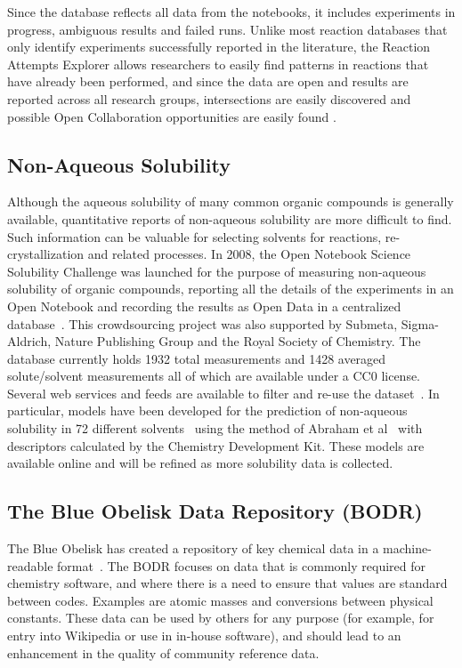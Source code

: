 \documentclass[10pt]{bmc_article}
\newenvironment{bmcformat}{\fussy\setboolean{publ}{true}}{\fussy}
\begin{document}
\begin{bmcformat}
Since the database reflects all data
from the notebooks, it includes experiments in progress, ambiguous results and
failed runs. Unlike most reaction databases that only identify
experiments successfully reported in the literature, 
the Reaction
Attempts Explorer allows researchers to easily find patterns in
reactions that have already been performed, 
and since the data are open
and results are reported across all research groups, intersections are
easily discovered and possible Open Collaboration opportunities are
easily found \cite{UsefulChemSocialNetworks, ekins_collaboration_2011}.

\subsection*{Non-Aqueous Solubility}

Although the aqueous solubility of many common organic compounds is
generally available, quantitative reports of non-aqueous solubility
are more difficult to find.
Such information can be valuable for selecting solvents for
reactions, re-crystallization and related processes. In 2008, the Open
Notebook Science Solubility Challenge was launched for the purpose of
measuring non-aqueous solubility of organic compounds, reporting all
the details of the experiments in an Open Notebook and recording the
results as Open Data in a centralized
database~\cite{ONS2010, BeautifulData_2009}.
This crowdsourcing project was also supported by Submeta,
Sigma-Aldrich, Nature Publishing Group and the Royal Society of
Chemistry. The database currently holds 1932 total measurements and
1428 averaged solute/solvent measurements all of which are available under
a CC0 license.  Several web services and
feeds are available to filter and re-use the dataset~\cite{SolubilityServices}.
In particular, models have been developed for the prediction of
non-aqueous solubility in 72 different
solvents~\cite{UCSolubilityPrediction}
using the method of Abraham et al~\cite{AbrahamSolubility} with
descriptors calculated by
the Chemistry Development Kit. These models are available online and
will be refined as more solubility data is collected.

\subsection*{The Blue Obelisk Data Repository (BODR)}

The Blue Obelisk has created a repository of key chemical
data in a machine-readable format~\cite{BODR}.
The BODR focuses on data that is commonly required for
chemistry software, and where there is a need to ensure that values
are standard between codes. Examples are atomic
masses and conversions between physical constants. These data
can be used by others for any purpose (for example, for entry into
Wikipedia or use in in-house software), and should lead
to an enhancement in the quality of community reference data.


\end{bmcformat}
\end{document}
